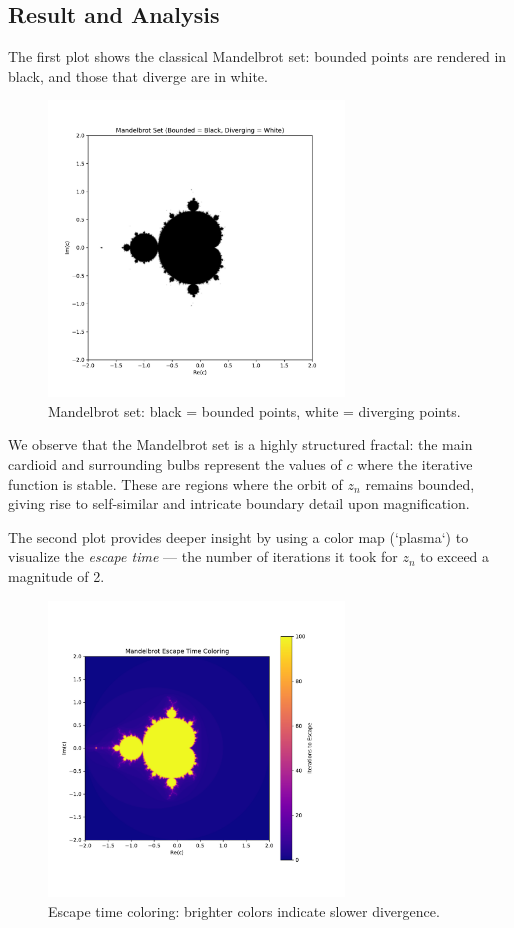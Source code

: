 \documentclass[12pt]{article}
\begin{document}
\subsection*{Result and Analysis}
The first plot shows the classical Mandelbrot set: bounded points are rendered in black, and those that diverge are in white.

\begin{figure}[H]
    \centering
    \includegraphics[width=0.7\textwidth]{mandelbrot_1.pdf}
    \caption{Mandelbrot set: black = bounded points, white = diverging points.}
\end{figure}

We observe that the Mandelbrot set is a highly structured fractal: the main cardioid and surrounding bulbs represent the values of \( c \) where the iterative function is stable. These are regions where the orbit of \( z_n \) remains bounded, giving rise to self-similar and intricate boundary detail upon magnification.

The second plot provides deeper insight by using a color map (`plasma`) to visualize the \emph{escape time} — the number of iterations it took for \( z_n \) to exceed a magnitude of 2.

\begin{figure}[H]
    \centering
    \includegraphics[width=0.7\textwidth]{mandelbrot_2.pdf}
    \caption{Escape time coloring: brighter colors indicate slower divergence.}
\end{figure}
\end{document}
